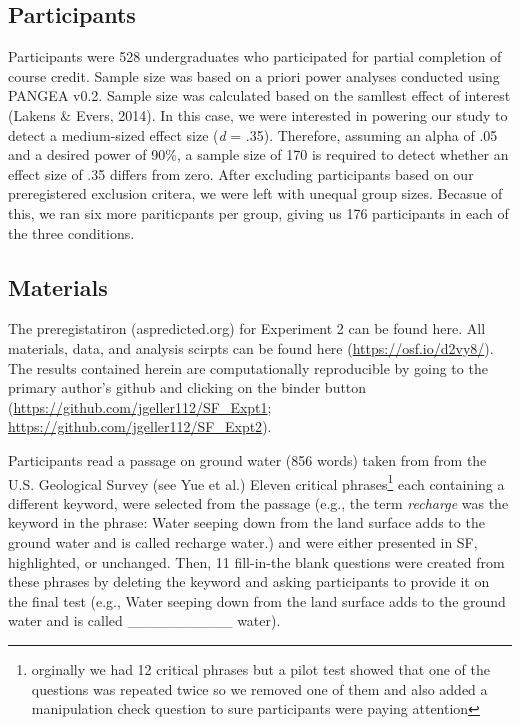 \documentclass[pdf]{apa6}
\begin{document}
\hypertarget{participants-1}{%
\subsection{Participants}\label{participants-1}}

Participants were 528 undergraduates who participated for partial completion of course credit. Sample size was based on a priori power analyses conducted using PANGEA v0.2. Sample size was calculated based on the samllest effect of interest (Lakens \& Evers, 2014). In this case, we were interested in powering our study to detect a medium-sized effect size (\emph{d} = .35). Therefore, assuming an alpha of .05 and a desired power of 90\%, a sample size of 170 is required to detect whether an effect size of .35 differs from zero. After excluding participants based on our preregistered exclusion critera, we were left with unequal group sizes. Becasue of this, we ran six more pariticpants per group, giving us 176 participants in each of the three conditions.

\hypertarget{materials-1}{%
\subsection{Materials}\label{materials-1}}

The preregistatiron (aspredicted.org) for Experiment 2 can be found here. All materials, data, and analysis scirpts can be found here (\url{https://osf.io/d2vy8/}). The results contained herein are computationally reproducible by going to the primary author's github and clicking on the binder button (\url{https://github.com/jgeller112/SF_Expt1}; \url{https://github.com/jgeller112/SF_Expt2}).

Participants read a passage on ground water (856 words) taken from from the U.S. Geological Survey (see Yue et al.) Eleven critical phrases\footnote{orginally we had 12 critical phrases but a pilot test showed that one of the questions was repeated twice so we removed one of them and also added a manipulation check question to sure participants were paying attention} each containing a different keyword, were selected from the passage (e.g., the term \emph{recharge} was the keyword in the phrase: Water seeping down from the land surface adds to the ground water and is called recharge water.) and were either presented in SF, highlighted, or unchanged. Then, 11 fill-in-the blank questions were created from these phrases by deleting the keyword and asking participants to provide it on the final test (e.g., Water seeping down from the land surface adds to the ground water and is called \_\_\_\_\_\_\_\_\_\_ water).
\end{document}
